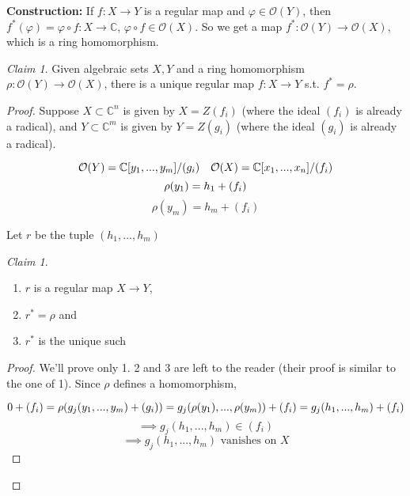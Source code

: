 \documentclass[12pt]{article}
\theoremstyle{remark}
\newtheorem{claim}[theorem]{Claim}
\begin{document}
\textbf{Construction:} If $f:X\rightarrow Y$ is a regular map and $\varphi\in \mathcal{O}(Y)$, then $f^*(\varphi)=\varphi\circ f:X\rightarrow \mathbb{C}$, $\varphi\circ f\in \mathcal{O}(X)$. So we get a map $f^*:\mathcal{O}(Y)\rightarrow\mathcal{O}(X)$, which is a ring homomorphism.

\begin{claim}

Given algebraic sets $X,Y$ and a ring homomorphism $\rho:\mathcal{O}(Y)\rightarrow\mathcal{O}(X)$, there is a unique regular map $f:X\rightarrow Y$ s.t. $f^*=\rho$.

\end{claim}

\begin{proof}

Suppose  $X\subset \mathbb{C}^n$ is given by $X=Z(f_i)$ (where the ideal $(f_i)$ is already a radical), and $Y\subset \mathbb{C}^m$ is given by $Y=Z(g_i)$ (where the ideal $(g_i)$ is already a radical).

\[
    \mathcal{O}(Y)=\mathbb{C}[y_1,...,y_m]/(g_i) \quad \mathcal{O}(X)=\mathbb{C}[x_1,...,x_n]/(f_i)\\
\]
\[
    \rho(y_1)=h_1+(f_i)\\
\]
\[
    \rho(y_m)=h_m+(f_i)
\]

Let $r$ be the tuple $(h_1,...,h_m)$

\begin{claim}

\begin{enumerate}

    \item $r$ is a regular map $X\rightarrow Y$,

    \item $r^*=\rho$ and

    \item $r^*$ is the unique such

\end{enumerate}

\end{claim}

\begin{proof}

We'll prove only 1. 2 and 3 are left to the reader (their proof is similar to the one of 1). Since $\rho$ defines a homomorphism,

\[
    0+(f_i)=\rho (g_j(y_1,...,y_m)+(g_i))=g_j(\rho(y_1),...,\rho(y_m))+(f_i) = g_j(h_1,...,h_m)+(f_i)\\
\]
\[
    \implies g_j(h_1,...,h_m)\in (f_i)
\]
\[
    \implies g_j(h_1,...,h_m) \text{ vanishes on } X
\]


\end{proof}

\end{proof}
\end{document}
